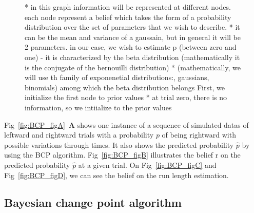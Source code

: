 \documentclass[profile,final,english, draft]{article}%
\begin{document}
\begin{figure}
{* in this graph information will be represented at different nodes. each node represent a belief which takes the form of a probability distribution over the set of parameters that we wish to describe.
* it can be the mean and variance of a gaussain, but in general it will be 2 parameters. in our case, we wish to estimate p (between zero and one) - it is characterized by the beta distribution (mathematically it is the conjugate of the bernouilli distribution)
* (mathematically, we will use th family of exponenetial distributions:, gaussians, binomials) among which the beta distribution belongs
First, we initialize the first node to prior values
* at trial zero, there is no information, so we intiialize to the prior values
}
\label{fig:results_bcp}
\end{figure}


Fig~\ref{fig:BCP_figA}~\textbf{A} shows one instance of a sequence of simulated datas of leftward and rightward trials with a probability $p$ of being rightward with possible variations through times. It also shows the predicted probability $\hat{p}$ by using the BCP algorithm. Fig~\ref{fig:BCP_figB} illustrates the belief r on the predicted probability $\hat{p}$ at a given trial. On Fig~\ref{fig:BCP_figC} and Fig~\ref{fig:BCP_figD}, we can see the belief on the run length estimation. 
 
 

\subsection{Bayesian change point algorithm}
\end{document}
